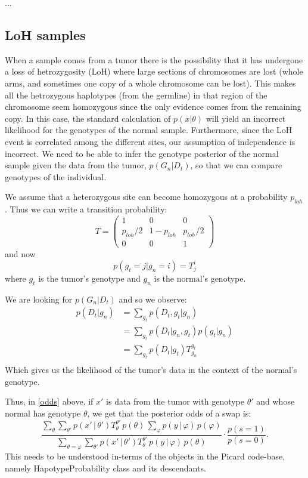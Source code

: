 \documentclass[12pt]{article}
\begin{document}
...
\subsection{LoH samples}
When a sample comes from a tumor there is the possibility that it has undergone a loss of hetrozygosity (LoH) where large sections of chromosomes are lost (whole arms, and sometimes one copy of a whole chromosome can be lost).
This makes all the hetrozygous haplotypes (from the germline) in that region of the chromosome seem homozygous since the only evidence comes from the remaining copy.
In this case, the standard calculation of $p(x|\theta)$ will yield an incorrect likelihood for the genotypes of the normal sample. Furthermore, since the LoH event is correlated among the different sites, our assumption of independence is incorrect.  
We need to be able to infer the genotype posterior of the normal sample given the data from the tumor, $p(G_n|D_t)$,  so that we can compare genotypes of the individual.

We assume that a heterozygous site can become homozygous at a probability $p_{loh}$. Thus we can write a transition probability:
\begin{equation}
T= \begin{pmatrix}
1 & 0 & 0 \\
p_{loh}/2 & 1-p_{loh} & p_{loh}/2\\
0 & 0 & 1
\end{pmatrix}
\end{equation}
and now
\begin{equation}
p(g_t=j|g_n=i) = T^i_j
\end{equation}
where $g_t$ is the tumor's genotype and $g_n$ is the normal's genotype.

We are looking for $p(G_n|D_t)$ and so we observe:
\begin{align*}
p(D_t|g_n)&=\sum_{g_t}p(D_t,g_t|g_n)\\
&=\sum_{g_t}p(D_t|g_n,g_t)p(g_t|g_n)\\
&=\sum_{g_t}p(D_t|g_t) T^{g_t}_{g_n}\\
\end{align*}
Which gives us the likelihood of the tumor's data in the context of the normal's genotype.

Thus, in \eqref{odds} above, if $x'$ is data from the tumor with genotype $\theta'$ and whose normal has genotype $\theta$, we get that the posterior odds of a swap is:
\begin{equation}
\boxed{\frac{\sum_\theta \sum_{\theta'} p(x' \, | \, \theta')T_{\theta}^{\theta'} \, p(\theta) \, \sum_{\varphi} p(y \, | \, \varphi) \, p(\varphi)}{\sum_{\theta = \varphi}  \sum_{\theta'} p(x' \, | \, \theta')T_{\theta}^{\theta'} \, p(y \, | \, \varphi) \, p(\theta)} \cdot \frac{p(s=1)}{p(s=0)}.}
\end{equation}
This needs to be understood in-terms of the objects in the Picard code-base, namely HapotypeProbability class and its descendants.
\end{document}
